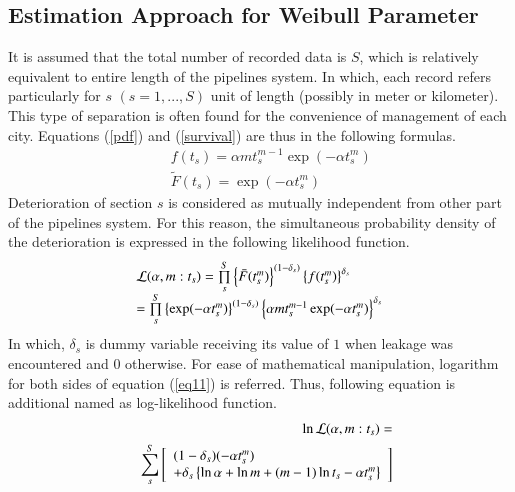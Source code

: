 \documentclass[a4paper,oneside,onecolumn,preprint,10pt,authoryear]{elsarticle}
\begin{document}
\subsection{Estimation Approach for Weibull Parameter}
\label{552}
It is assumed that the total number of recorded data is $S$, which is relatively equivalent to entire length of the pipelines system. In which, each record refers particularly for $s$ $(s=1,...,S)$ unit of length (possibly in meter or kilometer). This type of separation is often found for the convenience of management of each city. Equations (\ref{pdf}) and (\ref{survival}) are thus in the following formulas.
\begin{eqnarray}
&& f(t_s)=\alpha mt_s^{m-1}\exp(-\alpha t_s^m) \\
&& \tilde{F}(t_s)=\exp(-\alpha t_s^m)
\end{eqnarray}
Deterioration of section $s$ is considered as mutually independent from other part of the pipelines system. For this reason, the simultaneous probability density of the deterioration is expressed in the following likelihood function. 
\begin{eqnarray}
\begin{array}{l}
 {\cal L} (\alpha , m: t_s) = \prod\limits_s^S {\left\{ {\bar F(t_s^m )} \right\}^{(1 - \delta _s )} \left\{ {f(t_s^m )} \right\}^{\delta _s } }    \\
= \prod\limits_s^S {\left\{ {\exp ( - \alpha t_s^m )} \right\}^{(1 - \delta _s )} \left\{ {\alpha mt_s^{m - 1} \exp ( -  \alpha t_s^m )} \right\}^{\delta _s } }  \label{eq11}
 \end{array}
\end{eqnarray}
In which, $\delta_s$ is dummy variable receiving its value of $1$ when leakage was encountered and $0$ otherwise. For ease of mathematical manipulation, logarithm for both sides of equation (\ref{eq11}) is referred. Thus, following equation is additional named as log-likelihood function.
\begin{eqnarray}
&&\ln {\cal L} (\alpha, m: t_s )=  \nonumber \\ 
&&\sum\limits_s^S {\left[ \begin{array}{l}
 (1 - \delta _s )( - \alpha t_s^m ) \\ 
  + \delta _s \left\{ {\ln \alpha  + \ln m + (m - 1)\ln t_s  - \alpha t_s^m } \right\} \\ 
 \end{array} \right]} \label{weilike}
\end{eqnarray}
\end{document}
